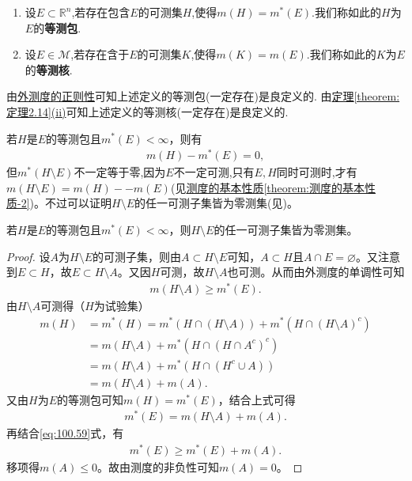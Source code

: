 \documentclass[../../main.tex]{subfiles}%
\begin{document}
\begin{definition}[等测包与等测核]
\begin{enumerate}
\item 设$E\subset \mathbb{R}^n$,若存在包含$E$的可测集$H$,使得$m(H)=m^*(E)$.我们称如此的$H$为$E$的\textbf{等测包}.

\item 设$E\in \mathscr{M}$,若存在含于$E$的可测集$K$,使得$m(K)=m(E)$.我们称如此的$K$为$E$的\textbf{等测核}.
\end{enumerate}
\end{definition}
\begin{note}
由\hyperref[theorem:外测度的正则性]{外测度的正则性}可知上述定义的等测包(一定存在)是良定义的.
由\hyperref[theorem:定理2.14]{定理\ref{theorem:定理2.14}(ii)}可知上述定义的等测核(一定存在)是良定义的.
\end{note}
\begin{remark}
若\(H\)是\(E\)的等测包且\(m^*(E)<\infty\)，则有
\begin{align*}
m(H) - m^*(E) = 0,
\end{align*}
但\(m^*(H\setminus E)\)不一定等于零,因为$E$不一定可测,只有$E,H$同时可测时,才有$m(H\setminus E)=m(H)--m(E)$(见\hyperref[theorem:测度的基本性质]{测度的基本性质\ref{theorem:测度的基本性质-2}})。不过可以证明\(H\setminus E\)的任一可测子集皆为零测集(见)。
\end{remark}

\begin{proposition}\label{proposition:等测包与原集合差的可测子集必为零测集}
若\(H\)是\(E\)的等测包且\(m^*(E)<\infty\)，则\(H\setminus E\)的任一可测子集皆为零测集。
\end{proposition}
\begin{proof}
设\(A\)为\(H\setminus E\)的可测子集，则由\(A\subset H\setminus E\)可知，\(A\subset H\)且\(A\cap E=\varnothing\)。又注意到\(E\subset H\)，故\(E\subset H\setminus A\)。又因\(H\)可测，故\(H\setminus A\)也可测。从而由外测度的单调性可知
\begin{align}
m(H\setminus A)\geqslant m^*(E).\label{eq:100.59}
\end{align}
由\(H\setminus A\)可测得（\(H\)为试验集）
\begin{align*}
m(H)&=m^*(H)=m^*(H\cap(H\setminus A))+m^*(H\cap(H\setminus A)^c)\\
&=m(H\setminus A)+m^*(H\cap(H\cap A^c)^c)
\\
&=m(H\setminus A)+m^*(H\cap(H^c\cup A))\\
&=m(H\setminus A)+m(A).
\end{align*}
又由\(H\)为\(E\)的等测包可知\(m(H)=m^*(E)\)，结合上式可得
\begin{align*}
m^*(E)=m(H\setminus A)+m(A).
\end{align*}
再结合\eqref{eq:100.59}式，有
\begin{align*}
m^*(E)\geqslant m^*(E)+m(A).
\end{align*}
移项得\(m(A)\leqslant0\)。故由测度的非负性可知\(m(A)=0\)。
\end{proof}
\end{document}
